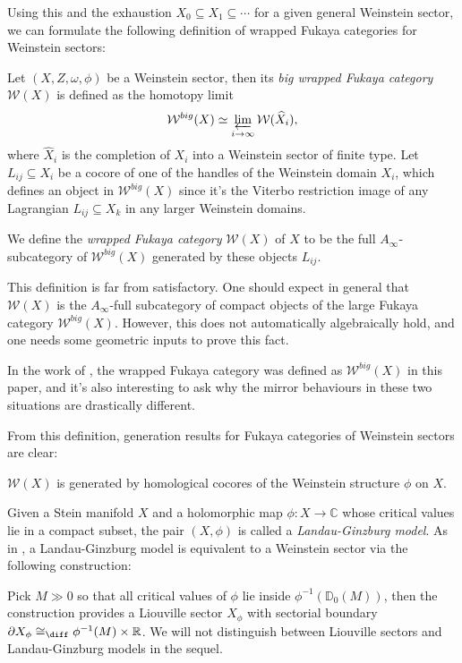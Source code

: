 Using this and the exhaustion $X_0\subseteq X_1\subseteq\dotsb$ for a given general Weinstein sector, we can formulate the following definition of wrapped Fukaya categories for Weinstein sectors:
\begin{dfn}\label{defn:wrapped-Fukaya-cat-inf-sectors}
    Let $(X,Z,\omega,\phi)$ be a Weinstein sector, then its \emph{big wrapped Fukaya category} $\mathcal{W} (X)$ is defined as the homotopy limit \[
        \mathcal{W}^{big} (X)\simeq\varprojlim_{i\to\infty}\mathcal{W} (\widehat{X}_i),
    \]where $\widehat{X}_i$ is the completion of $X_i$ into a Weinstein sector of finite type. Let $L_{ij}\subseteq X_i$ be a cocore of one of the handles of the Weinstein domain $X_i$, which defines an object in $\mathcal{W}^{big} (X)$ since it's the Viterbo restriction image of any Lagrangian $L_{ij}\subseteq X_k$ in any larger Weinstein domains.\par
    We define the \emph{wrapped Fukaya category} $\mathcal{W} (X)$ of $X$ to be the full $A_{\infty}$-subcategory of $\mathcal{W}^{big} (X)$ generated by these objects $L_{ij}$.
\end{dfn}
\begin{rmk}
    This definition is far from satisfactory. One should expect in general that $\mathcal{W} (X)$ is the $A_{\infty}$-full subcategory of compact objects of the large Fukaya category $\mathcal{W}^{big} (X)$. However, this does not automatically algebraically hold, and one needs some geometric inputs to prove this fact. \par
    In the work of \cite{KW25}, the wrapped Fukaya category was defined as $\mathcal{W}^{big} (X)$ in this paper, and it's also interesting to ask why the mirror behaviours in these two situations are drastically different.
\end{rmk}
From this definition, generation results for Fukaya categories of Weinstein sectors are clear:
\begin{lmm}\label{lmm:generation-Weinstein-sector}
    $\mathcal{W} (X)$ is generated by homological cocores of the Weinstein structure $\phi$ on $X$.
\end{lmm}
Given a Stein manifold $X$ and a holomorphic map $\phi\colon X\to\mathbb{C}$ whose critical values lie in a compact subset, the pair $(X,\phi)$ is called a \emph{Landau-Ginzburg model}. As in \cite{GPS20}, a Landau-Ginzburg model is equivalent to a Weinstein sector via the following construction:\par
Pick $M\gg 0$ so that all critical values of $\phi$ lie inside $\phi^{-1} (\mathbb{D}_0 (M))$, then the construction \cite[Definition 2.14]{GPS20} provides a Liouville sector $X_{\phi}$ with sectorial boundary $\partial X_{\phi}\cong_{\diff} \phi^{-1} (M)\times\mathbb{R}$. We will not distinguish between Liouville sectors and Landau-Ginzburg models in the sequel.
